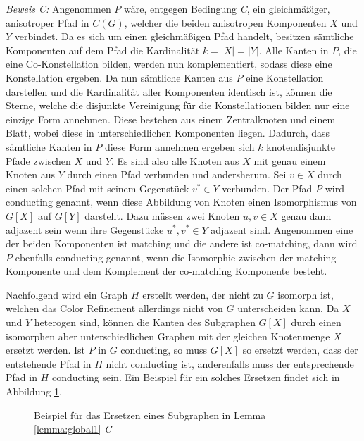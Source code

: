 \emph{Beweis C:} Angenommen $P$ wäre, entgegen Bedingung \emph{C}, ein gleichmäßiger, anisotroper Pfad in $C(G)$, welcher die beiden anisotropen Komponenten $X$ und $Y$ verbindet.
Da es sich um einen gleichmäßigen Pfad handelt, besitzen sämtliche Komponenten auf dem Pfad die Kardinalität $k=|X|=|Y|$.
Alle Kanten in $P$, die eine Co-Konstellation bilden, werden nun komplementiert, sodass diese eine Konstellation ergeben.
Da nun sämtliche Kanten aus $P$ eine Konstellation darstellen und die Kardinalität aller Komponenten identisch ist, können die Sterne, welche die disjunkte Vereinigung für die Konstellationen bilden nur eine einzige Form annehmen.
Diese bestehen aus einem Zentralknoten und einem Blatt, wobei diese in unterschiedlichen Komponenten liegen.
Dadurch, dass sämtliche Kanten in $P$ diese Form annehmen ergeben sich $k$ knotendisjunkte Pfade zwischen $X$ und $Y$.
Es sind also alle Knoten aus $X$ mit genau einem Knoten aus $Y$ durch einen Pfad verbunden und andersherum.
Sei $v\in X$ durch einen solchen Pfad mit seinem Gegenstück $v^*\in Y$ verbunden.
Der Pfad $P$ wird conducting genannt, wenn diese Abbildung von Knoten einen Isomorphismus von $G[X]$ auf $G[Y]$ darstellt.
Dazu müssen zwei Knoten $u,v\in X$ genau dann adjazent sein wenn ihre Gegenstücke $u^*,v^*\in Y$ adjazent sind.
Angenommen eine der beiden Komponenten ist matching und die andere ist co-matching, dann wird $P$ ebenfalls conducting genannt, wenn die Isomorphie zwischen der matching Komponente und dem Komplement der co-matching Komponente besteht.

Nachfolgend wird ein Graph $H$ erstellt werden, der nicht zu $G$ isomorph ist, welchen das Color Refinement allerdings nicht von $G$ unterscheiden kann.
Da $X$ und $Y$ heterogen sind, können die Kanten des Subgraphen $G[X]$ durch einen isomorphen aber unterschiedlichen Graphen mit der gleichen Knotenmenge $X$ ersetzt werden.
Ist $P$ in $G$ conducting, so muss $G[X]$ so ersetzt werden, dass der entstehende Pfad in $H$ nicht conducting ist, anderenfalls muss der entsprechende Pfad in $H$ conducting sein.
Ein Beispiel für ein solches Ersetzen findet sich in Abbildung \ref{fig:global_c}.

\begin{figure}[t]
	\centering
	\caption{Beispiel für das Ersetzen eines Subgraphen in Lemma \ref{lemma:global1} \emph{C}}
	\label{fig:global_c}
\end{figure}

